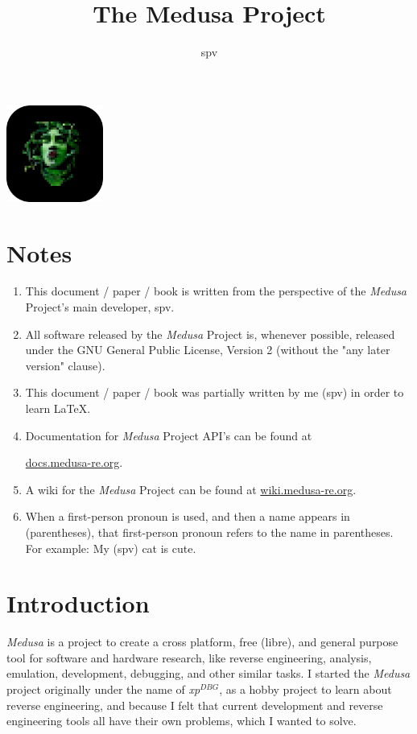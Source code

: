 \documentclass{article}
\title{The Medusa Project}
\author{spv}
\newcommand{\xpDBG}{\textit{xp$^{DBG}$}\xspace}
\begin{document}
	\maketitle

	\begin{center}
		\includegraphics[width=120px]{../res/img/medusa_logo_lus_rounded.png}
	\end{center}

	\section{Notes}
	\begin{enumerate}
		\item This document / paper / book is written from the perspective of
		the \textit{Medusa} Project's main developer, spv.

		\item All software released by the \textit{Medusa} Project is, whenever
		possible, released under the GNU General Public License, Version 2
		(without the "any later version" clause).

		\item This document / paper / book was partially written by me (spv) in
		order to learn \LaTeX.

		\item Documentation for \textit{Medusa} Project API's can be found at
		
		\href{https://docs.medusa-re.org}{docs.medusa-re.org}.

		\item A wiki for the \textit{Medusa} Project can be found at
		\href{https://wiki.medusa-re.org}{wiki.medusa-re.org}.

		\item When a first-person pronoun is used, and then a name appears in
		(parentheses), that first-person pronoun refers to the name in
		parentheses. For example: My (spv) cat is cute.
	\end{enumerate}

	\section{Introduction}
	\textit{Medusa} is a project to create a cross platform, free (libre), and
	general purpose tool for software and hardware research, like reverse
	engineering, analysis, emulation, development, debugging, and other similar
	tasks. I started the \textit{Medusa} project originally under the name of
	\xpDBG, as a hobby project to learn about reverse engineering, and because I
	felt that current development and reverse engineering tools all have their
	own problems, which I wanted to solve.
\end{document}
